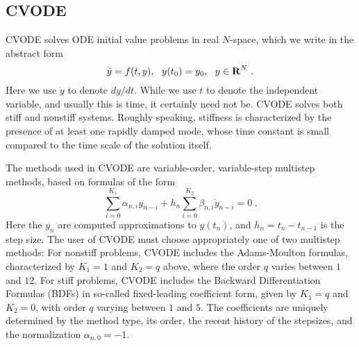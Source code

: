 \subsection{CVODE}\label{ss:cvode}

CVODE solves ODE initial value problems in real $N$-space, which we
write in the abstract form
\begin{equation}\label{ODE} 
  \dot{y} = f(t,y),~~ y(t_0) = y_0,~~ y \in \mbox{\bf R}^N ~.
\end{equation}
Here we use $\dot{y}$ to denote $dy/dt$.  While we use $t$ to denote
the independent variable, and usually this is time, it certainly need
not be.  CVODE solves both stiff and nonstiff systems.  Roughly
speaking, stiffness is characterized by the presence of at least one
rapidly damped mode, whose time constant is small compared to the time
scale of the solution itself.

The methods used in CVODE are variable-order, variable-step multistep
methods, based on formulas of the form
\begin{equation}\label{LMM} 
 \sum_{i = 0}^{K_1} \alpha_{n,i} y_{n-i} + 
     h_n \sum_{i = 0}^{K_2} \beta_{n,i} \dot{y}_{n-i} = 0 ~.
\end{equation}
Here the $y_n$ are computed approximations to $y(t_n)$, and
$h_n = t_n - t_{n-1}$ is the step size.  The user of CVODE must choose
appropriately one of two multistep methods: For nonstiff problems,
CVODE includes the Adams-Moulton formulas, characterized by $K_1 = 1$
and $K_2 = q$ above, where the order $q$ varies between $1$ and $12$.
For stiff problems, CVODE includes the Backward Differentiation
Formulas (BDFs) in so-called fixed-leading coefficient form, given by
$K_1 = q$ and $K_2 = 0$, with order $q$ varying between $1$ and $5$.
The coefficients are uniquely determined by the method type, its
order, the recent history of the stepsizes, and the normalization
$\alpha_{n,0} = -1$.

